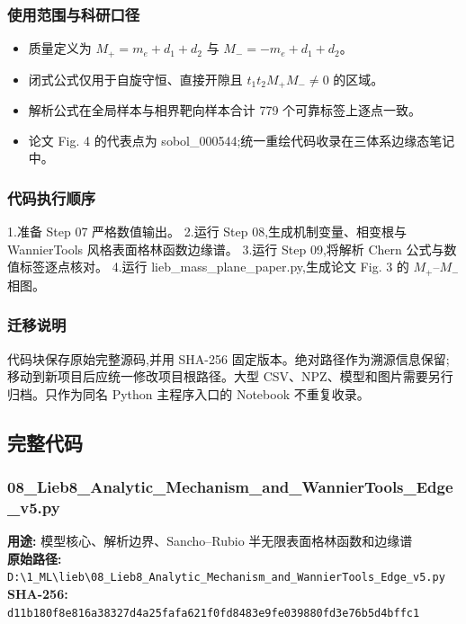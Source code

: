 \documentclass[lang=cn,scheme=chinese,color=blue,device=normal,toc=onecol,math=cm]{elegantbook}
\begin{document}
\subsubsection{使用范围与科研口径}


\begin{itemize}
\item 质量定义为 \(M_+=m_e+d_1+d_2\) 与 \(M_-=-m_e+d_1+d_2\)。
\item 闭式公式仅用于自旋守恒、直接开隙且 \(t_1t_2M_+M_-\neq0\) 的区域。
\item 解析公式在全局样本与相界靶向样本合计 779 个可靠标签上逐点一致。
\item 论文 Fig. 4 的代表点为 sobol\_\allowbreak{}000544;统一重绘代码收录在三体系边缘态笔记中。
\end{itemize}


\subsubsection{代码执行顺序}


1.准备 Step 07 严格数值输出。 2.运行 Step 08,生成机制变量、相变根与 WannierTools 风格表面格林函数边缘谱。 3.运行 Step 09,将解析 Chern 公式与数值标签逐点核对。 4.运行 lieb\_\allowbreak{}mass\_\allowbreak{}plane\_\allowbreak{}paper.py,生成论文 Fig. 3 的 \(M_+\)–\(M_-\) 相图。\par


\subsubsection{迁移说明}


代码块保存原始完整源码,并用 SHA-256 固定版本。绝对路径作为溯源信息保留;移动到新项目后应统一修改项目根路径。大型 CSV、NPZ、模型和图片需要另行归档。只作为同名 Python 主程序入口的 Notebook 不重复收录。\par


\subsection{完整代码}


\subsubsection{08\_\allowbreak{}Lieb8\_\allowbreak{}Analytic\_\allowbreak{}Mechanism\_\allowbreak{}and\_\allowbreak{}WannierTools\_\allowbreak{}Edge\_\allowbreak{}v5.py}


\textbf{用途:} 模型核心、解析边界、Sancho–Rubio 半无限表面格林函数和边缘谱\\ \textbf{原始路径:} \texttt{D:\textbackslash{}\allowbreak{}1\_\allowbreak{}ML\textbackslash{}\allowbreak{}lieb\textbackslash{}\allowbreak{}08\_\allowbreak{}Lieb8\_\allowbreak{}Analytic\_\allowbreak{}Mechanism\_\allowbreak{}and\_\allowbreak{}WannierTools\_\allowbreak{}Edge\_\allowbreak{}v5.py}\\ \textbf{SHA-256:} \texttt{d11b180f8e816a38327d4a25fafa621f0fd8483e9fe039880fd3e76b5d4bffc1}\par
\end{document}
